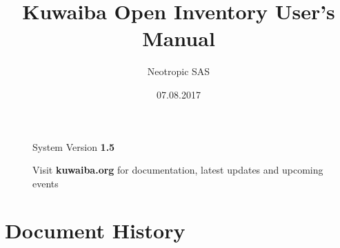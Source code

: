 \documentclass[a4paper]{article}
\title{Kuwaiba Open Inventory User's Manual}
\author{Neotropic SAS}
\date{07.08.2017}
\begin{document}
	\maketitle
	
	
	
	\begin{figure}[b]
		\centering System Version \textbf{1.5}
			
		Visit \textbf{kuwaiba.org} for documentation, latest updates and upcoming events
	\end{figure}
	
	
	\newpage
	
	\tableofcontents
	
	\clearpage
	\section{Document History}
\end{document}
